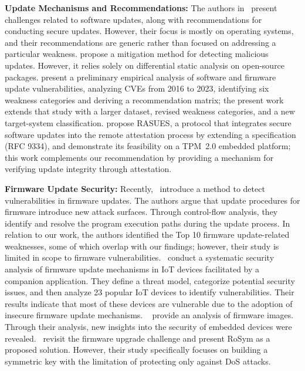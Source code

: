 \documentclass[fleqn,s1,names,tex]{neptune}
\begin{document}
\cvpt\textbf{Update Mechanisms and Recommendations:}
The authors in~\citet{268927} present challenges related to software updates,
along with recommendations for conducting secure updates. 
However, their focus is mostly on operating systems, and their recommendations are generic rather than focused on addressing a particular weakness.
\citet{10.1145/3605770.3625211} propose a mitigation method for detecting
malicious updates. However, it relies solely on differential static analysis on open-source packages.
\citet{10.1007/978-3-031-92886-4_7} present a preliminary
empirical analysis of software and firmware update vulnerabilities, analyzing
CVEs from 2016 to 2023, identifying six weakness categories and deriving a
recommendation matrix; the present work extends that study with a larger
dataset, revised weakness categories, and a new target-system classification.
\citet{10.1007/s10207-026-01233-1} propose RASUES, a protocol that integrates
secure software updates into the remote attestation process by extending a
specification (RFC 9334), and demonstrate its feasibility on a TPM~2.0 embedded
platform; this work complements our recommendation by providing a mechanism for
verifying update integrity through attestation.

 

\cvpt\textbf{Firmware Update Security:}
 Recently,~\citet{294541} introduce a method to detect vulnerabilities in
firmware updates.
The authors argue that update procedures for firmware introduce new attack surfaces. 
Through control-flow analysis, they identify and resolve the program execution
paths during the update process.  In relation to our work, the authors
identified the Top 10 firmware update-related weaknesses, some of which overlap
with our findings; however, their study is limited in scope to firmware
vulnerabilities.~\citet{10190484} conduct a systematic security analysis of
firmware update mechanisms in IoT devices facilitated by a companion
application. 
They define a threat model, categorize potential security issues, and then analyze 23 popular IoT devices to identify vulnerabilities.
Their results indicate that most of these devices are vulnerable due to the adoption of insecure firmware update mechanisms.
~\citet{costin2014large} provide an analysis of firmware images. Through their
analysis, new insights into the security of embedded devices were revealed.~\citet{10.1145/3560826.3563381} revisit the firmware
upgrade challenge and present RoSym as a proposed solution. However, their
study specifically focuses on building a symmetric key with the limitation of
protecting only against DoS attacks.
\end{document}
